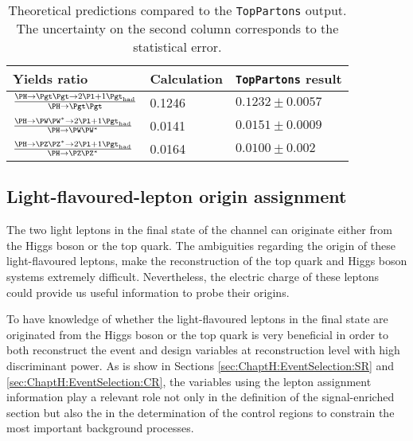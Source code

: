 \begin{table}[]
\centering
\begin{tabular}{l|l|l}
\toprule
Yields ratio								&   Calculation   	& \texttt{TopPartons} result \\
\midrule
$\frac{\Htautau \rightarrow \dileptau }{\Htautau}$  	&   0.1246         	&  $0.1232  \pm 0.0057$ 	\\ 
$\frac{\HWW 	\rightarrow \dileptau}{\HWW}$       	&   0.0141        		&  $0.0151  \pm 0.0009$   \\ 
$\frac{\HZZ 	\rightarrow \dileptau }{\HZZ}$           	&   0.0164         	&  $0.0100  \pm 0.002$     \\ \bottomrule
\end{tabular}
\caption{Theoretical predictions compared to the \texttt{TopPartons} output. 
The uncertainty on the second column corresponds to the statistical error. }
\label{tab:ChaptH:Prediction_VS_TopPartons}
\end{table}



\subsection{Light-flavoured-lepton origin assignment}
\label{sec:ChaptH:Sig:LepAsign}
The two light leptons in the final state of the \dileptau channel can originate either from the 
Higgs boson or the top quark. The ambiguities regarding the origin of these light-flavoured
leptons, make the reconstruction of the top quark and Higgs boson systems extremely difficult.
Nevertheless, the electric charge of these leptons could provide us useful information to probe their origins.

To have knowledge of whether the light-flavoured leptons in the final state are originated from
the Higgs boson or the top quark is very beneficial in order to both reconstruct the event and
design variables at reconstruction level with high discriminant power. As is show in 
Sections \ref{sec:ChaptH:EventSelection:SR} and \ref{sec:ChaptH:EventSelection:CR},
the variables using the lepton assignment information play a relevant role not only in 
the definition of the signal-enriched section but also the in the determination of 
 the control regions to constrain the most important background processes.

